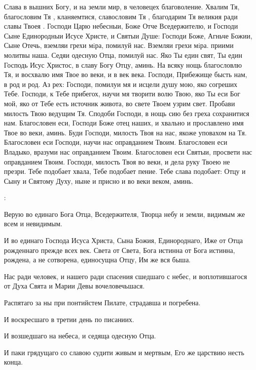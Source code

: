 \begin{mymulticols}
Слава в вышних Богу, и на земли мир, в человецех благоволение. Хвалим Тя, благословим Тя , кланяемтися, славословим Тя , благодарим Тя великия ради славы Твоея . Господи Царю небесныи, Боже Отче Вседержителю, и Господи Сыне Единородныи Исусе Христе, и Святыи Душе: Господи Боже, Агньче Божии, Сыне Отечь, вземляи грехи мiра, помилуй нас. Вземляи грехи мiра. приими молитвы наша. Седяи одесную Отца, помилуй нас. Яко Ты един свят, Ты един Господь Исус Христос, в славу Богу Отцу, аминь. На всяку нощь благословлю Тя, и восхвалю имя Твое во веки, и в век века. Господи, Прибежище бысть нам, в род и род. Аз рех: Господи, помилуи мя и исцели душу мою, яко согреших Тебе. Господи, к Тебе прибегох, научи мя творити волю Твою, яко Ты еси Бог мой, яко от Тебе есть источник живота, во свете Твоем узрим свет. Пробави милость Твою ведущим Тя. Сподоби Господи, в нощь сию без греха сохранитися нам. Благословен еси, Господи Боже отец наших, и хвально и прославлено имя Твое во веки, аминь. Буди Господи, милость Твоя на нас, якоже уповахом на Тя. Благословен еси Господи, научи нас оправданием Твоим. Благословен еси Владыко, вразуми нас оправданием Твоим. Благословен еси Святыи, просвети нас оправданием Твоим. Господи, милость Твоя во веки, и дела руку Твоею не презри. Тебе подобает хвала, Тебе подобает пение. Тебе слава подобает: Отцу и Сыну и Святому Духу, ныне и присно и во веки веком, аминь.

: 

Верую во единаго Бога Отца, Вседержителя, Творца небу и земли, видимым же всем и невидимым.

И во единаго Господа Исуса Христа, Сына Божия, Единороднаго, Иже от Отца рожденнаго прежде всех век. Света от Света, Бога истинна от Бога истинна, рождена, а не сотворена, единосущна Отцу, Им же вся быша.

Нас ради человек, и нашего ради спасения сшедшаго с небес, и воплотившагося от Духа Свята и Марии Девы вочеловечьшася.

Распятаго за ны при понтийстем Пилате, страдавша и погребена.

И воскресшаго в третии день по писаниих.

И возшедшаго на небеса, и седяща одесную Отца.

И паки грядущаго со славою судити живым и мертвым, Его же царствию несть конца.



\end{mymulticols}
